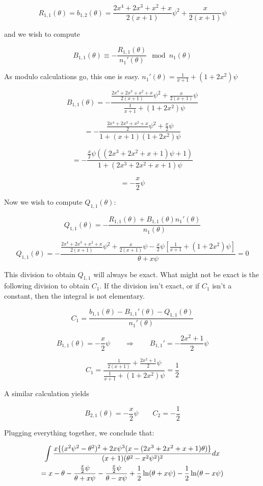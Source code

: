 $$R_{1,1}(\theta) = b_{1,2}(\theta) = \frac{2x^4+2x^3+x^2+x}{2(x+1)}\psi^2 + \frac{x}{2(x+1)} \psi$$

and we wish to compute

$$ B_{1,1}(\theta) \equiv - \frac{R_{1,1}(\theta)}{n_1'(\theta) } \mod n_1(\theta)$$

As modulo calculations go, this one is easy. $n_1'(\theta) = \frac{1}{x+1} + (1 + 2 x^2) \psi$

$$ B_{1,1}(\theta) = - \frac{\frac{2x^4+2x^3+x^2+x}{2(x+1)}\psi^2 + \frac{x}{2(x+1)} \psi}{\frac{1}{x+1} + (1 + 2 x^2) \psi}$$

$$ = - \frac{\frac{2x^4+2x^3+x^2+x}{2}\psi^2 + \frac{x}{2} \psi}{1 + (x+1)(1 + 2 x^2) \psi}$$


$$ = - \frac{\frac{x}{2}\psi ( (2x^3+2x^2+x+1)\psi + 1)}{1 + (2 x^3 + 2 x^2 + x + 1) \psi}$$

$$ = - \frac{x}{2}\psi$$

Now we wish to compute $Q_{1,1}(\theta)$:

$$ Q_{1,1}(\theta) = - \frac{R_{1,1}(\theta) + B_{1,1}(\theta) n_1'(\theta)}{n_1(\theta)}$$

$$ Q_{1,1}(\theta) = - \frac{\frac{2x^4+2x^3+x^2+x}{2(x+1)}\psi^2 + \frac{x}{2(x+1)} \psi - \frac{x}{2}\psi \left[\frac{1}{x+1} + (1 + 2 x^2) \psi\right]}{\theta + x \psi} = 0$$

This division to obtain $Q_{1,1}$ will always be exact.  What might not be exact is the following division
to obtain $C_{1}$.  If the division isn't exact, or if $C_1$ isn't a constant, then the integral is not elementary.

$$ C_1 = \frac{b_{1,1}(\theta) - B_{1,1}'(\theta) - Q_{1,1}(\theta)}{n_1'(\theta)} $$

$$B_{1,1}(\theta) = -\frac{x}{2}\psi \qquad\Longrightarrow\qquad B_{1,1}' = -\frac{2x^2+1}{2}\psi$$

$$ C_1 = \frac{\frac{1}{2(x+1)} + \frac{2x^2+1}{2}\psi}{\frac{1}{x+1} + (1 + 2 x^2) \psi} = \frac{1}{2}$$

A similar calculation yields

$$B_{2,1}(\theta) = -\frac{x}{2}\psi \qquad C_2 = -\frac{1}{2}$$

Plugging everything together, we conclude that:

\begin{multline*}
\int{{x\{(x^2 \psi^2-\theta^2)^2+2x \psi^3(x-(2x^3+2x^2+x+1)\theta)\}}\over{(x+1)(\theta^2 - x^2\psi^2)^2}} dx \\
= x - \theta -\frac{\frac{x}{2}\psi}{\theta + x \psi} - \frac{\frac{x}{2}\psi}{\theta - x \psi} + \frac{1}{2}\ln(\theta + x\psi)- \frac{1}{2}\ln(\theta - x \psi)
\end{multline*}

